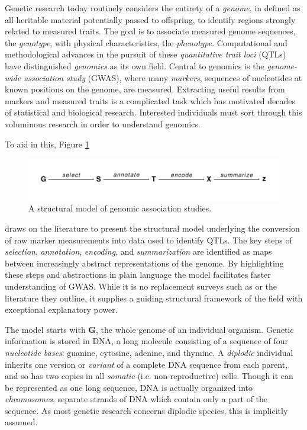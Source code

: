 \documentclass[sts]{imsart}
\newcommand{\m}[1]{\mathbf{#1}}               %
\begin{document}
Genetic research today routinely considers the entirety of a \emph{genome}, in \cite{doergeetal1997search} defined as all heritable material potentially passed to offspring, to identify regions strongly related to measured traits. The goal is to associate measured genome sequences, the \emph{genotype}, with physical characteristics, the \emph{phenotype}. Computational and methodological advances in the pursuit of these \emph{quantitative trait loci} (QTLs) have distinguished \emph{genomics} as its own field. Central to genomics is the \emph{genome-wide association study} (GWAS), where many \emph{markers}, sequences of nucleotides at known positions on the genome, are measured. Extracting useful results from markers and measured traits is a complicated task which has motivated decades of statistical and biological research. Interested individuals must sort through this voluminous research in order to understand genomics.

To aid in this, Figure \ref{fig:modelDiagram}
\begin{figure}[h]
  \begin{center}
  \includegraphics[scale = 1]{../img/modelDiagram.pdf}
  \caption{A structural model of genomic association
    studies.} \label{fig:modelDiagram}
  \end{center}
\end{figure}
draws on the literature to present the structural model underlying the conversion of raw marker measurements into data used to identify QTLs. The key steps of \emph{selection}, \emph{annotation}, \emph{encoding}, and \emph{summarization} are identified as maps between increasingly abstract representations of the genome. By highlighting these steps and abstractions in plain language the model facilitates faster understanding of GWAS. While it is no replacement surveys such as \cite{uffelmannetal2021gwas, tametal2019benefits} or the literature they outline, it supplies a guiding structural framework of the field with exceptional explanatory power.

The model starts with $\m{G}$, the whole genome of an individual organism. Genetic information is stored in DNA, a long molecule consisting of a sequence of four \emph{nucleotide bases}: guanine, cytosine, adenine, and thymine. A \emph{diplodic} individual inherits one version or \emph{variant} of a complete DNA sequence from each parent, and so has two copies in all \emph{somatic} (i.e. non-reproductive) cells. Though it can be represented as one long sequence, DNA is actually organized into \emph{chromosomes}, separate strands of DNA which contain only a part of the sequence. As most genetic research concerns diplodic species, this is implicitly assumed.
\end{document}
